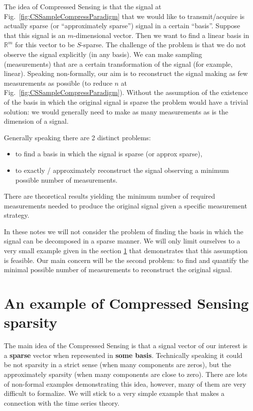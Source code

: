 \documentclass[11pt]{article}
\numberwithin{equation}{section}
\theoremstyle{definition}
\begin{document}
The idea of Compressed Sensing is that the signal at Fig.~\ref{fig:CSSampleCompressParadigm} that we would like to transmit/acquire is actually sparse (or ``approximately sparse'') signal in a certain ``basis''.
Suppose that this signal is an $m$-dimensional vector.
Then we want to find a linear basis in $\mathbb R^m$ for this vector to be $S$-sparse.
The challenge of the problem is that we do not observe the signal explicitly (in any basis).
We can make sampling (measurements) that are a certain transformation of the signal (for example, linear).
Speaking non-formally, our aim is to reconstruct the signal making as few measurements as possible (to reduce $n$ at Fig.~\ref{fig:CSSampleCompressParadigm}).
Without the assumption of the existence of the basis in which the original signal is sparse the problem would have a trivial solution: we would generally need to make as many measurements as is the dimension of a signal.

Generally speaking there are 2 distinct problems:
\begin{itemize}
    \item to find a basis in which the signal is sparse (or approx sparse),
    \item to exactly / approximately reconstruct the signal observing a minimum possible number of measurements.
\end{itemize}
There are theoretical results yielding the minimum number of required measurements needed to produce the original signal given a specific measurement strategy.

In these notes we will not consider the problem of finding the basis in which the signal can be decomposed in a sparse manner.
We will only limit ourselves to a very small example given in the section \ref{sec:motivation} that demonstrates that this assumption is feasible.
Our main concern will be the second problem: to find and quantify the minimal possible number of measurements to reconstruct the original signal.

\section{An example of Compressed Sensing sparsity}
\label{sec:motivation}
The main idea of the Compressed Sensing is that a signal vector of our interest is a \textbf{sparse} vector when represented in \textbf{some basis}.
Technically speaking it could be not sparsity in a strict sense (when many components are zeros), but the approximately sparsity (when many components are close to zero).
There are lots of non-formal examples demonstrating this idea, however, many of them are very difficult to formalize.
We will stick to a very simple example that makes a connection with the time series theory.
\end{document}

